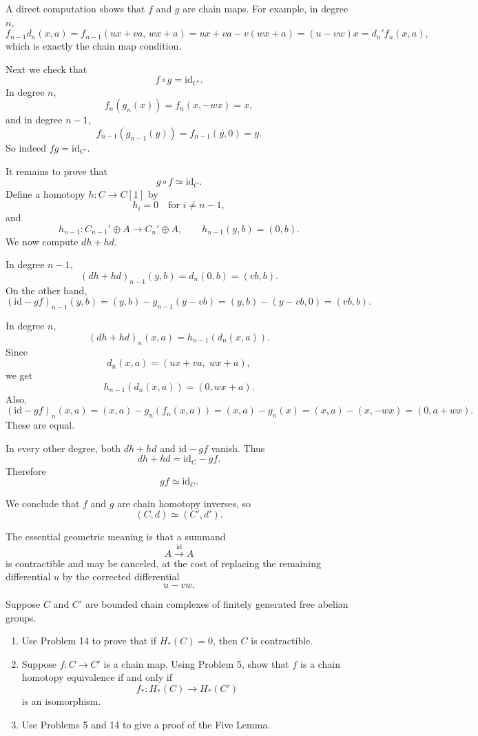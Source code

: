 \begin{solution}
A direct computation shows that \(f\) and \(g\) are chain maps. For example, in degree \(n\),
\[
f_{n-1}d_n(x,a)
=
f_{n-1}(ux+va,\,wx+a)
=
ux+va-v(wx+a)
=
(u-vw)x
=
d_n' f_n(x,a),
\]
which is exactly the chain map condition.

Next we check that
\[
f\circ g=\mathrm{id}_{C'}.
\]
In degree \(n\),
\[
f_n(g_n(x))=f_n(x,-wx)=x,
\]
and in degree \(n-1\),
\[
f_{n-1}(g_{n-1}(y))=f_{n-1}(y,0)=y.
\]
So indeed \(fg=\mathrm{id}_{C'}\).

It remains to prove that
\[
g\circ f \simeq \mathrm{id}_C.
\]
Define a homotopy \(h:C\to C[1]\) by
\[
h_i=0 \quad \text{for } i\neq n-1,
\]
and
\[
h_{n-1}:C_{n-1}'\oplus A\to C_n'\oplus A,
\qquad
h_{n-1}(y,b)=(0,b).
\]
We now compute \(dh+hd\).

In degree \(n-1\),
\[
(dh+hd)_{n-1}(y,b)=d_n(0,b)=(vb,b).
\]
On the other hand,
\[
(\mathrm{id}-gf)_{n-1}(y,b)
=
(y,b)-g_{n-1}(y-vb)
=
(y,b)-(y-vb,0)
=
(vb,b).
\]

In degree \(n\),
\[
(dh+hd)_n(x,a)=h_{n-1}(d_n(x,a)).
\]
Since
\[
d_n(x,a)=(ux+va,\;wx+a),
\]
we get
\[
h_{n-1}(d_n(x,a))=(0,wx+a).
\]
Also,
\[
(\mathrm{id}-gf)_n(x,a)
=
(x,a)-g_n(f_n(x,a))
=
(x,a)-g_n(x)
=
(x,a)-(x,-wx)
=
(0,a+wx).
\]
These are equal.

In every other degree, both \(dh+hd\) and \(\mathrm{id}-gf\) vanish. Thus
\[
dh+hd=\mathrm{id}_C-gf.
\]
Therefore
\[
gf\simeq \mathrm{id}_C.
\]

We conclude that \(f\) and \(g\) are chain homotopy inverses, so
\[
\boxed{(C,d)\simeq (C',d').}
\]

\par

The essential geometric meaning is that a summand
\[
A\xrightarrow{\mathrm{id}}A
\]
is contractible and may be canceled, at the cost of replacing the remaining differential \(u\) by the corrected differential
\[
u-vw.
\]
\end{solution}

\begin{problem}
Suppose \(C\) and \(C'\) are bounded chain complexes of finitely generated free abelian groups.

\begin{enumerate}
	\item[(a)] Use Problem 14 to prove that if \(H_*(C)=0\), then \(C\) is contractible.
	\item[(b)] Suppose \(f:C\to C'\) is a chain map. Using Problem 5, show that \(f\) is a chain homotopy equivalence if and only if
	\[
	f_*:H_*(C)\to H_*(C')
	\]
	is an isomorphism.
	\item[(c)] Use Problems 5 and 14 to give a proof of the Five Lemma.
\end{enumerate}

\par
\end{problem}

